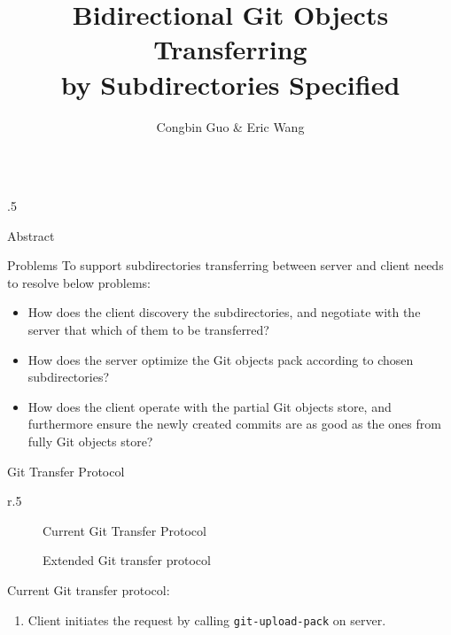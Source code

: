 \documentclass[final]{beamer}
\title{Bidirectional Git Objects Transferring\\ by Subdirectories Specified}
\author{Congbin Guo \& Eric Wang}
\institute{VMware Inc.}
\begin{document}
\begin{frame}[t, fragile]
  \begin{columns}[t]
    \begin{column}{.5\linewidth}
      \begin{block}{Abstract}
        
      \end{block}
      \begin{block}{Problems}
To support subdirectories transferring between server and client needs to
resolve below problems:
\begin{itemize}
    \justifying
  \item How does the client discovery the subdirectories, and negotiate with
      the server that which of them to be transferred?

  \item How does the server optimize the Git objects pack according to chosen
      subdirectories?

  \item How does the client operate with the partial Git objects store, and
      furthermore ensure the newly created commits are as good as the ones
      from fully Git objects store?
\end{itemize}
      \end{block}
      \begin{block}{Git Transfer Protocol}
        \begin{wrapfigure}{r}{.5\textwidth}
          \begin{minipage}{.5\textwidth}
            \begin{figure} \centering
              \caption{Current Git Transfer Protocol}
            \end{figure}
            \begin{figure} \centering
              \caption{Extended Git transfer protocol}
            \end{figure}
          \end{minipage}
        \end{wrapfigure}
            Current Git transfer protocol:
\begin{enumerate}
    \justifying
  \item Client initiates the request by calling \verb|git-upload-pack| on
    server.


\end{enumerate}
\end{block}
\end{column}
\end{columns}
\end{frame}
\end{document}
